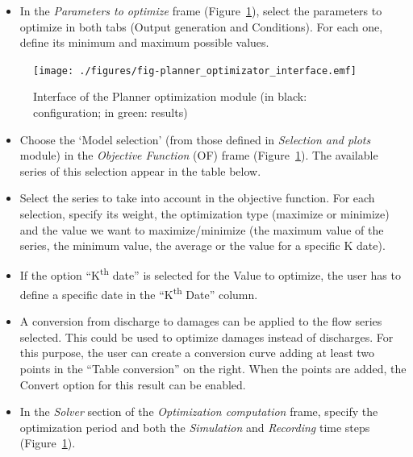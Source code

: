 \documentclass[
  letterpaper,
  DIV=11,
  numbers=noendperiod]{scrreprt}
\providecommand{\tightlist}{%
  \setlength{\itemsep}{0pt}\setlength{\parskip}{0pt}}\usepackage{longtable,booktabs,array}
\begin{document}
\begin{itemize}
\tightlist
\item
  {In the \emph{Parameters to optimize} frame
  (Figure~\ref{fig-planner_optimizator_interface}), select the
  parameters to optimize in both tabs (Output generation and
  Conditions). For each one, define its minimum and maximum possible
  values.}
\end{itemize}

\begin{figure}

{\centering \texttt{[image: ./figures/fig-planner\_optimizator\_interface.emf]}

}

\caption{\label{fig-planner_optimizator_interface}Interface of the
Planner optimization module (in black: configuration; in green:
results)}

\end{figure}

\begin{itemize}
\item
  {Choose the `Model selection' (from those defined in \emph{Selection
  and plots} module) in the \emph{Objective Function} (OF) frame
  (Figure~\ref{fig-planner_optimizator_interface}).} The available
  series of this selection appear in the table below.
\item
  {Select the series to take into account in the objective function. For
  each selection, specify its weight, the optimization type (maximize or
  minimize) and the value we want to maximize/minimize (the maximum
  value of the series, the minimum value, the average or the value for a
  specific K date).}
\item
  {If the option ``K\textsuperscript{th} date'' is selected for the
  Value to optimize, the user has to define a specific date in the
  ``K\textsuperscript{th} Date'' column.}
\item
  {A conversion from discharge to damages can be applied to the flow
  series selected. This could be used to optimize damages instead of
  discharges. For this purpose, the user can create a conversion curve
  adding at least two points in the ``Table conversion'' on the right.
  When the points are added, the Convert option for this result can be
  enabled.}
\item
  {In the \emph{Solver} section of the \emph{Optimization computation}
  frame, specify the optimization period and both the \emph{Simulation}
  and \emph{Recording} time steps
  (Figure~\ref{fig-planner_optimizator_interface}).}
\end{itemize}
\end{document}
